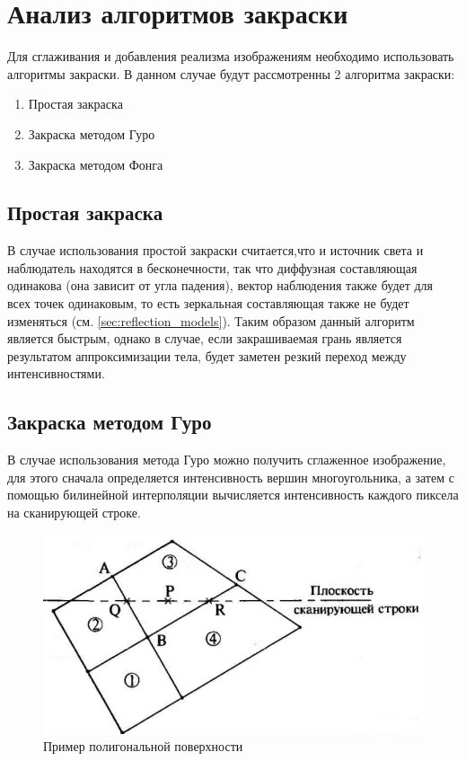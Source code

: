 \documentclass[a4paper,14pt, unknownkeysallowed]{extreport}
\begin{document}
\section{Анализ алгоритмов закраски}
Для сглаживания и добавления реализма изображениям  необходимо использовать алгоритмы закраски.
В данном случае будут рассмотренны 2 алгоритма закраски:
\begin{enumerate}
	\item Простая закраска
	\item Закраска методом Гуро
	\item Закраска методом Фонга
\end{enumerate}

\subsection{Простая закраска}
В случае использования простой закраски считается,что и источник света и наблюдатель находятся в бесконечности,
так что диффузная составляющая одинакова (она зависит от угла падения), вектор наблюдения также будет для всех точек одинаковым, то есть зеркальная составляющая
также не будет изменяться (см. \ref{sec:reflection_models}). 
Таким образом данный алгоритм является быстрым, однако в случае, если закрашиваемая грань является результатом аппроксимизации тела, 
будет заметен резкий переход между интенсивностями. \cite{Rodgers}


\subsection{Закраска методом Гуро}
В случае использования метода Гуро можно получить сглаженное изображение, для этого сначала определяется интенсивность вершин многоугольника, а
затем с помощью билинейной интерполяции вычисляется интенсивность каждого пиксела на сканирующей строке.

\begin{figure}[H]
	\centering
	\includegraphics{guro}
	\caption{Пример полигональной поверхности}
	\label{fig:guro_polygon}
\end{figure} 
\end{document}
